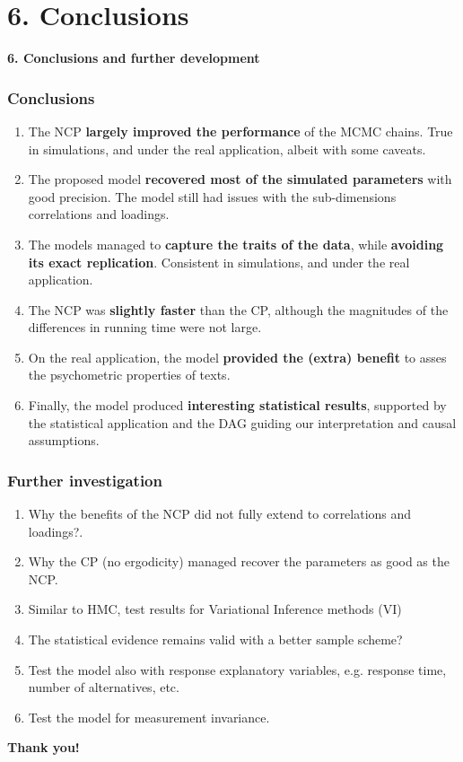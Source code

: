 \documentclass[nonav,sleutel]{beamer}
\begin{document}
	\section{6. Conclusions}
	\begin{frame}
		\LARGE{\textbf{6. Conclusions and further development}}
	\end{frame}
	\begin{frame}
		\frametitle{Conclusions}
		\begin{enumerate}
			\item The NCP \textbf{largely improved the performance} of the MCMC chains. True in simulations, and under the real application, albeit with some caveats.
			\item The proposed model \textbf{recovered most of the simulated parameters} with good precision. The model still had issues with the sub-dimensions correlations and loadings.
			\item The models managed to \textbf{capture the traits of the data}, while \textbf{avoiding its exact replication}. Consistent in simulations, and under the real application.
			\item The NCP was \textbf{slightly faster} than the CP, although the magnitudes of the differences in running time were not large.
			\item On the real application, the model \textbf{provided the (extra) benefit} to asses the psychometric properties of texts.
			\item Finally, the model produced \textbf{interesting statistical results}, supported by the statistical application and the DAG guiding our interpretation and causal assumptions.
		\end{enumerate}
	\end{frame}
	\begin{frame}
		\frametitle{Further investigation}
		\begin{enumerate}
			\item Why the benefits of the NCP did not fully extend to correlations and loadings?.
			\item Why the CP (no ergodicity) managed recover the parameters as good as the NCP.
			\item Similar to HMC, test results for Variational Inference methods (VI)
			\item The statistical evidence remains valid with a better sample scheme?
			\item Test the model also with response explanatory variables, e.g. response time, number of alternatives, etc.
			\item Test the model for measurement invariance.
		\end{enumerate}
	\end{frame}
	\begin{frame}
		\LARGE{\textbf{Thank you!}}
	\end{frame}
\end{document}
